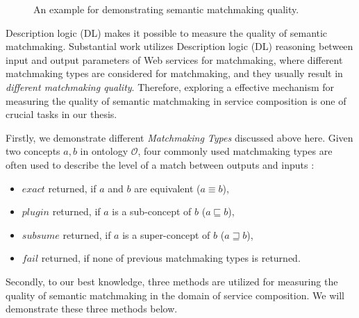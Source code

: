 \begin{figure}
\centerline{
}
\caption{An example for demonstrating semantic matchmaking quality.}
\label{fig:sm_example}
\end{figure}

Description logic (DL) makes it possible to measure the quality of semantic matchmaking. Substantial work \cite{bansal2016generalized,lecue2009optimizing, lecue2007making, lecue2006formal, rao2005semantic} utilizes Description logic (DL) reasoning between input and output parameters of Web services for matchmaking, where different matchmaking types are considered for matchmaking, and they usually result in \emph{different matchmaking quality}. Therefore, exploring a effective mechanism for measuring the quality of semantic matchmaking in service composition is one of crucial tasks in our thesis. 

Firstly, we demonstrate different \emph{Matchmaking Types} discussed above here. Given two concepts $a, b$ in ontology $\mathcal{O}$, four commonly used matchmaking types are often used to describe the level of a match between outputs and inputs \cite{paolucci2002semantic}: 
\begin{itemize}
\item $exact$ returned, if $a$ and $b$ are equivalent ($a \equiv b$), 
\item $plugin$ returned, if $a$ is a sub-concept of $b$ ($a \sqsubseteq b$),
\item $subsume$ returned, if $a$ is a super-concept of $b$ ($a \sqsupseteq b$), 
\item $fail$ returned, if none of previous matchmaking types is returned. 
\end{itemize}

Secondly, to our best knowledge, three methods  \cite{lecue2007making, pop2009immune,shet2012new} are utilized for measuring the quality of semantic matchmaking in the domain of service composition. We will demonstrate these three methods below.

